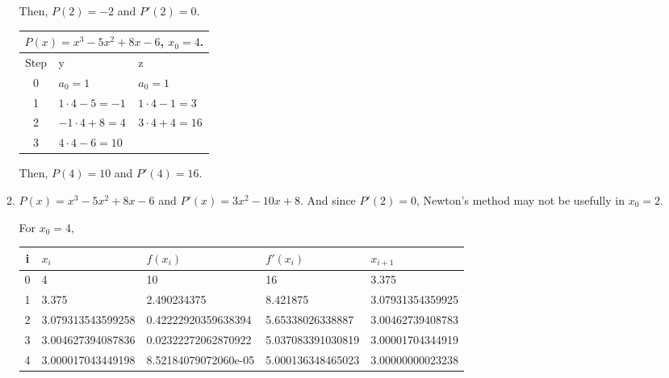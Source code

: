 \documentclass[12pt]{article}
\begin{document}
\begin{enumerate}
\begin{enumerate}
        Then, $P(2) = -2$ and $P'(2)=0$.

        \begin{tabular}{|c||p{5cm}|p{5cm}|}
            \hline
            \multicolumn{3}{|c|}{$P(x) = x^3 - 5x^2 + 8x -6$, $x_0 = 4$.}\\
            \hline
            Step & y & z\\
            \hline
            0 & $a_0 = 1$ & $a_0 = 1$\\
            1 & $1 \cdot 4 - 5 = -1$ & $1 \cdot 4 - 1 = 3$\\
            2 & $-1 \cdot 4 + 8 = 4$ & $3 \cdot 4 + 4 = 16$\\
            3 & $4 \cdot 4 - 6 = 10$ & \\
            \hline
        \end{tabular}

        Then, $P(4) = 10$ and $P'(4) = 16$.

        \item $P(x) = x^3 - 5x^2 + 8x -6$ and $P'(x) = 3x^2 - 10x + 8$.
        And since $P'(2) = 0$, Newton's method may not be usefully in $x_0 = 2$.

        For $x_0 = 4$, 
        \begin{center}
            \begin{tabular}{|c|llll|}
                \hline
                i & $x_i$ & $f(x_i)$ & $f'(x_i)$ & $x_{i+1}$\\ 
                \hline
                0 & 4 & 10 & 16 & 3.375\\
                1 & 3.375 & 2.490234375 & 8.421875 & 3.07931354359925\\
                2 & 3.079313543599258 & 0.42222920359638394 & 5.65338026338887 & 3.00462739408783\\
                3 & 3.004627394087836 & 0.02322272062870922 & 5.037083391030819 & 3.00001704344919\\
                4 & 3.000017043449198 & 8.52184079072060e-05 & 5.000136348465023 & 3.00000000023238\\
                \hline
            \end{tabular}
        \end{center}
        
    \end{enumerate}
\end{enumerate}
\end{document}
